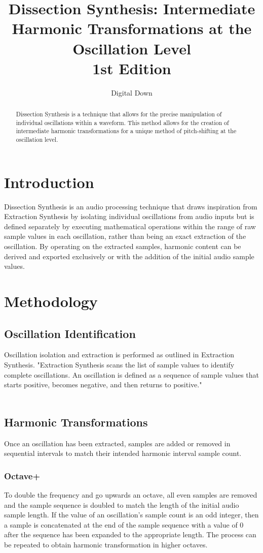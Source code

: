 \documentclass[12pt,a4paper]{article}
\title{Dissection Synthesis: Intermediate Harmonic Transformations at the Oscillation Level\\
\small{1st Edition}}
\author{Digital Down}
\begin{document}
\maketitle

\begin{abstract}
Dissection Synthesis is a technique that allows for the precise manipulation of individual oscillations within a waveform. This method allows for the creation of intermediate harmonic transformations for a unique method of pitch-shifting at the oscillation level.
\end{abstract}

\section{Introduction}
Dissection Synthesis is an audio processing technique that draws inspiration from Extraction Synthesis by isolating individual oscillations from audio inputs but is defined separately by executing mathematical operations within the range of raw sample values in each oscillation, rather than being an exact extraction of the oscillation. By operating on the extracted samples, harmonic content can be derived and exported exclusively or with the addition of the initial audio sample values.
\section{Methodology}

\subsection{Oscillation Identification}
Oscillation isolation and extraction is performed as outlined in Extraction Synthesis. \cite{DigitalDown2024}  "Extraction Synthesis scans the list of sample values to identify complete oscillations. An oscillation is defined as a sequence of sample values that starts positive, becomes negative, and then returns to positive."\\\\
\subsection{Harmonic Transformations}
Once an oscillation has been extracted, samples are added or removed in sequential intervals to match their intended harmonic interval sample count. 
\subsubsection{Octave+}
To double the frequency and go upwards an octave, all even samples are removed and the sample sequence is doubled to match the length of the initial audio sample length. If the value of an oscillation's sample count is an odd integer, then a sample is concatenated at the end of the sample sequence with a value of 0 after the sequence has been expanded to the appropriate length. The process can be repeated to obtain harmonic transformation in higher octaves.
\end{document}
